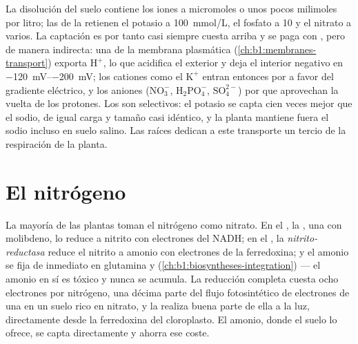 \begin{proposition}\label{prop:b1:plant-water-minerals:uptake}
La disolución del suelo contiene los iones a micromoles o unos pocos
milimoles por litro; las  de la  retienen el potasio a
\qty{100}{mmol/L}, el fosfato a \qty{10}{} y el nitrato a varios. La
captación es por tanto casi siempre cuesta arriba y se paga con , pero de
manera indirecta: una \emph{} de la membrana plasmática
(\cref{ch:b1:membranes-transport}) exporta $\mathrm{H^+}$, lo que acidifica
el exterior y deja el interior negativo en
\qtyrange{-120}{-200}{mV}; los cationes como el $\mathrm{K^+}$ entran
entonces por  a favor del gradiente eléctrico, y los aniones
($\mathrm{NO_3^-}$, $\mathrm{H_2PO_4^-}$, $\mathrm{SO_4^{2-}}$) por
 que aprovechan la vuelta de los protones. Los 
son selectivos: el potasio se capta cien veces mejor que el sodio, de igual
carga y tamaño casi idéntico, y la planta mantiene fuera el sodio incluso en
suelo salino. Las raíces dedican a este transporte un tercio de la
respiración de la planta.
\end{proposition}

\section{El nitrógeno}

\begin{proposition}\label{prop:b1:plant-water-minerals:nitrate}
La mayoría de las plantas toman el nitrógeno como nitrato. En el , la
\emph{}, una  con molibdeno, lo reduce a nitrito con
electrones del NADH; en el , la \emph{nitrito-reductasa} reduce el
nitrito a amonio con electrones de la ferredoxina; y el amonio se fija de
inmediato en glutamina y 
(\cref{ch:b1:biosyntheses-integration}) --- el amonio en sí es tóxico y
nunca se acumula. La reducción completa cuesta ocho electrones por
nitrógeno, una décima parte del flujo fotosintético de electrones de una
 en un suelo rico en nitrato, y la  realiza buena parte de ella a la
luz, directamente desde la ferredoxina del cloroplasto. El amonio, donde el
suelo lo ofrece, se capta directamente y ahorra ese coste.
\end{proposition}

